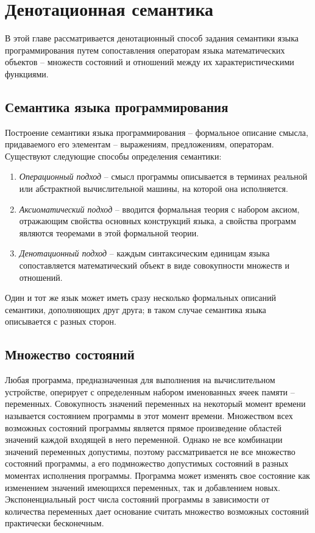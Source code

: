 \chapter{Денотационная семантика} \label{ch1}

В этой главе рассматривается денотационный способ задания семантики 
языка программирования путем сопоставления операторам языка математических объектов -- множеств состояний и 
отношений между их характеристическими функциями.

\section{Семантика языка программирования}
Построение семантики языка программирования -- формальное описание смысла, придаваемого его
элементам -- выражениям, предложениям, операторам. Существуют следующие способы определения семантики:
\begin{enumerate}
	\item \textit{Операционный подход} -- смысл программы описывается в терминах реальной или абстрактной
	вычислительной машины, на которой она исполняется.
	\item \textit{Аксиоматический подход} -- вводится формальная теория с набором аксиом, отражающим свойства
	основных конструкций языка, а свойства программ являются теоремами в этой формальной теории.
	\item \textit{Денотационный подход} -- каждым синтаксическим единицам языка сопоставляется математический объект
	в виде совокупности множеств и отношений.
\end{enumerate}

Один и тот же язык может иметь сразу несколько формальных описаний семантики, дополняющих друг друга;
в таком случае семантика языка описывается с разных сторон.

\section{Множество состояний}
Любая программа, предназначенная для выполнения на вычислительном устройстве, оперирует
с определенным набором именованных ячеек памяти -- переменных. 
Совокупность значений переменных на некоторый момент времени называется состоянием программы в этот момент времени. 
Множеством всех возможных состояний программы является прямое произведение областей значений каждой входящей в него переменной. Однако
не все комбинации значений переменных допустимы, поэтому рассматривается не все множество состояний программы, а его 
подмножество допустимых состояний в разных моментах исполнения программы.
Программа может изменять свое состояние как изменением значений имеющихся переменных, так и добавлением новых.
Экспоненциальный рост числа состояний программы в зависимости от количества переменных дает основание 
считать множество возможных состояний практически бесконечным.

